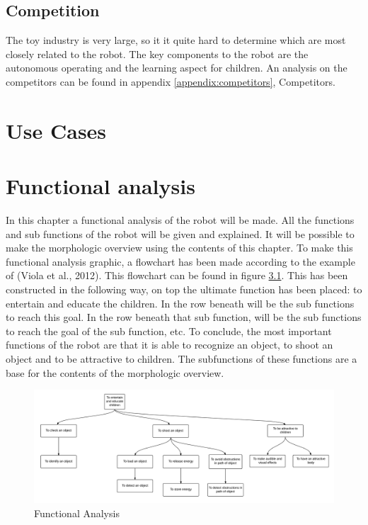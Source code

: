 \documentclass[11pt,twoside,a4paper]{report}
\begin{document}
\section{Competition}
The toy industry is very large, so it it quite hard to determine which are most closely related to the robot. The key components to the robot are the autonomous operating and the learning aspect for children. An analysis on the competitors can be found in appendix \ref{appendix:competitors}, Competitors.

\chapter{Use Cases}
\chapter{Functional analysis}
In this chapter a functional analysis of the robot will be made. All the functions and sub functions of the robot will be given and explained. It will be possible to make the morphologic overview using the contents of this chapter. 
To make this functional analysis graphic, a flowchart has been made according to the example of (Viola et al., 2012). This flowchart can be found in figure \ref{fig:FuncAnal}.
This has been constructed in the following way, on top the ultimate function has been placed: to entertain and educate the children. In the row beneath will be the sub functions to reach this goal. In the row beneath that sub function, will be the sub functions to reach the goal of the sub function, etc. 
To conclude, the most important functions of the robot are that it is able to recognize an object, to shoot an object and to be attractive to children. The subfunctions of these functions are a base for the contents of the morphologic overview. 

\begin{figure}[h]
\begin{center}
\includegraphics[width = 17cm]{Images/FunctionalAnalysis.png}
\end{center}
\caption{Functional Analysis}
\label{fig:FuncAnal}
\end{figure}
\end{document}
